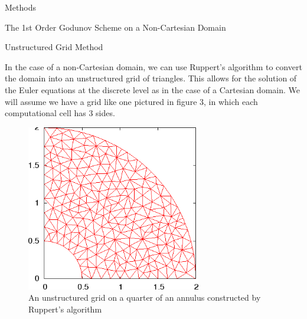 \begin{section}{Methods}
\begin{subsection}{The 1st Order Godunov Scheme on a Non-Cartesian Domain}
\begin{subsubsection}{Unstructured Grid Method}

In the case of a non-Cartesian domain, we can use Ruppert's algorithm to convert the domain into an unstructured grid of triangles. This allows for the solution of the Euler equations at the discrete level as in the case of a Cartesian domain. We will assume we have a grid like one pictured in figure 3, in which each computational cell has 3 sides. 
\begin{figure}[ht]
\centering
\includegraphics[width=3in]{unstructGrid}
\caption{An unstructured grid on a quarter of an annulus constructed by Ruppert's algorithm}
\end{figure}


\end{subsubsection}
\end{subsection}
\end{section}
